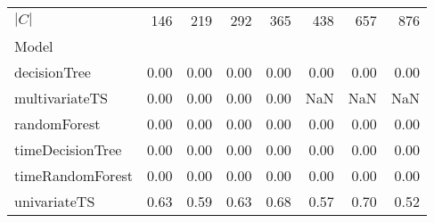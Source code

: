 \begin{tabular}{lrrrrrrr}
\toprule
$|C|$ & 146 & 219 & 292 & 365 & 438 & 657 & 876 \\
Model &  &  &  &  &  &  &  \\
\midrule
decisionTree & 0.00 & 0.00 & 0.00 & 0.00 & 0.00 & 0.00 & 0.00 \\
multivariateTS & 0.00 & 0.00 & 0.00 & 0.00 & NaN & NaN & NaN \\
randomForest & 0.00 & 0.00 & 0.00 & 0.00 & 0.00 & 0.00 & 0.00 \\
timeDecisionTree & 0.00 & 0.00 & 0.00 & 0.00 & 0.00 & 0.00 & 0.00 \\
timeRandomForest & 0.00 & 0.00 & 0.00 & 0.00 & 0.00 & 0.00 & 0.00 \\
univariateTS & 0.63 & 0.59 & 0.63 & 0.68 & 0.57 & 0.70 & 0.52 \\
\bottomrule
\end{tabular}
